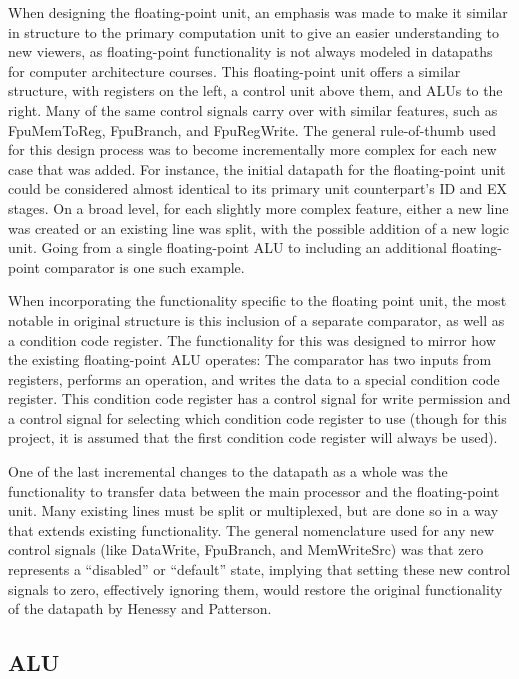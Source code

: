 \documentclass[
    paper=letter,
    parskip=half,
    fontsize=12pt,
    titlepage=firstiscover,
    toc=bibliography,
    numbers=endperiod
]{scrartcl}
\begin{document}
When designing the floating-point unit, an emphasis was made to make it
similar in structure to the primary computation unit to give an easier
understanding to new viewers, as floating-point functionality is not
always modeled in datapaths for computer architecture courses. This
floating-point unit offers a similar structure, with registers on the
left, a control unit above them, and ALUs to the right. Many of the same
control signals carry over with similar features, such as FpuMemToReg,
FpuBranch, and FpuRegWrite. The general rule-of-thumb used for this
design process was to become incrementally more complex for each new
case that was added. For instance, the initial datapath for the
floating-point unit could be considered almost identical to its primary
unit counterpart's ID and EX stages. On a broad level, for each slightly
more complex feature, either a new line was created or an existing line
was split, with the possible addition of a new logic unit. Going from a
single floating-point ALU to including an additional floating-point
comparator is one such example.

When incorporating the functionality specific to the floating point
unit, the most notable in original structure is this inclusion of a
separate comparator, as well as a condition code register. The
functionality for this was designed to mirror how the existing
floating-point ALU operates: The comparator has two inputs from
registers, performs an operation, and writes the data to a special
condition code register. This condition code register has a control
signal for write permission and a control signal for selecting which
condition code register to use (though for this project, it is assumed
that the first condition code register will always be used).

One of the last incremental changes to the datapath as a whole was the
functionality to transfer data between the main processor and the
floating-point unit. Many existing lines must be split or multiplexed,
but are done so in a way that extends existing functionality. The
general nomenclature used for any new control signals (like DataWrite,
FpuBranch, and MemWriteSrc) was that zero represents a ``disabled'' or
``default'' state, implying that setting these new control signals to
zero, effectively ignoring them, would restore the original
functionality of the datapath by Henessy and Patterson.

\subsection{ALU}
\end{document}
